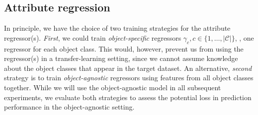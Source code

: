 \documentclass[10pt,twocolumn,letterpaper]{article}
\begin{document}
\subsection{Attribute regression}
\label{subsection:EvalCovariateRegression}

In principle, we have the choice of two training strategies
for the attribute regressor(s). \emph{First}, we could 
train \emph{object-specific} regressors 
$\gamma_c, c \in \{1,\ldots, |\mathcal{C}|\}$, \ie, one regressor
for each object class. This would, however, prevent us from 
using the regressor(s) in a transfer-learning setting, since we
cannot assume knowledge about the object classes that appear in
the target dataset. An alternative, \emph{second} 
strategy is to train \emph{object-agnostic} regressors 
using features from all object classes together. While 
we will use the object-agnostic model in all subsequent
experiments, we evaluate both strategies to assess 
the potential loss in prediction performance in the 
object-agnostic setting. 
\end{document}
